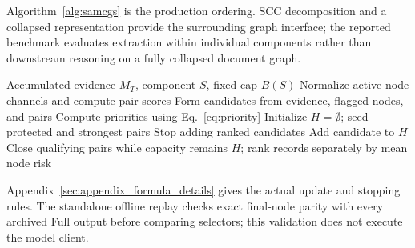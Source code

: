 \begin{revadded}
Algorithm~\ref{alg:samcgs} is the production ordering. SCC decomposition and a collapsed representation provide the surrounding graph interface; the reported benchmark evaluates extraction within individual components rather than downstream reasoning on a fully collapsed document graph.

\begin{algorithm}[!htbp]
\small
\caption{Final evidence-core readout}
\label{alg:appendix_dynamic_core}
\begin{algorithmic}[1]
\REQUIRE Accumulated evidence $M_T$, component $S$, fixed cap $B(S)$
\STATE Normalize active node channels and compute pair scores
\STATE Form candidates from evidence, flagged nodes, and pairs
\STATE Compute priorities using Eq.~\ref{eq:priority}
\STATE Initialize $H=\emptyset$; seed protected and strongest pairs
  \STATE Stop adding ranked candidates
 \ENDIF
 \STATE Add candidate to $H$
\ENDFOR
\STATE Close qualifying pairs while capacity remains
\RETURN $H$; rank records separately by mean node risk
\end{algorithmic}
\end{algorithm}

Appendix~\ref{sec:appendix_formula_details} gives the actual update and stopping rules. The standalone offline replay checks exact final-node parity with every archived Full output before comparing selectors; this validation does not execute the model client.
\end{revadded}
